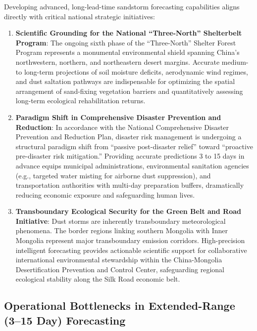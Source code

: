 Developing advanced, long-lead-time sandstorm forecasting capabilities aligns directly with critical national strategic initiatives:
\begin{enumerate}
    \item \textbf{Scientific Grounding for the National ``Three-North'' Shelterbelt Program}: The ongoing sixth phase of the ``Three-North'' Shelter Forest Program represents a monumental environmental shield spanning China's northwestern, northern, and northeastern desert margins. Accurate medium- to long-term projections of soil moisture deficits, aerodynamic wind regimes, and dust saltation pathways are indispensable for optimizing the spatial arrangement of sand-fixing vegetation barriers and quantitatively assessing long-term ecological rehabilitation returns.
    \item \textbf{Paradigm Shift in Comprehensive Disaster Prevention and Reduction}: In accordance with the National Comprehensive Disaster Prevention and Reduction Plan, disaster risk management is undergoing a structural paradigm shift from ``passive post-disaster relief'' toward ``proactive pre-disaster risk mitigation.'' Providing accurate predictions 3 to 15 days in advance equips municipal administrations, environmental sanitation agencies (e.g., targeted water misting for airborne dust suppression), and transportation authorities with multi-day preparation buffers, dramatically reducing economic exposure and safeguarding human lives.
    \item \textbf{Transboundary Ecological Security for the Green Belt and Road Initiative}: Dust storms are inherently transboundary meteorological phenomena. The border regions linking southern Mongolia with Inner Mongolia represent major transboundary emission corridors. High-precision intelligent forecasting provides actionable scientific support for collaborative international environmental stewardship within the China-Mongolia Desertification Prevention and Control Center, safeguarding regional ecological stability along the Silk Road economic belt.
\end{enumerate}

\subsection{Operational Bottlenecks in Extended-Range (3--15 Day) Forecasting}
\label{subsec:extended_range_bottleneck}

